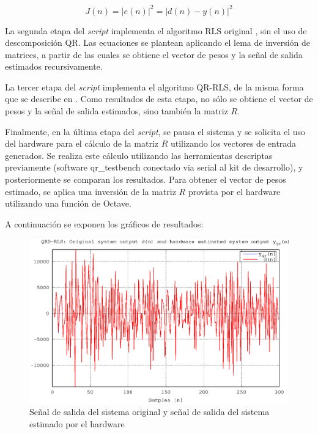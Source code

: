 \begin{equation}
J(n) = |e(n)|^2 = |d(n) - y(n)|^2
\end{equation}

La segunda etapa del \textit{script} implementa el algoritmo RLS original \cite{Haykin}, sin el uso de descomposición QR. Las ecuaciones se plantean aplicando el lema de inversión de matrices, a partir de las cuales se obtiene el vector de pesos y la señal de salida estimados recursivamente.

La tercer etapa del \textit{script} implementa el algoritmo QR-RLS, de la misma forma que se describe en \cite{Haykin}. Como resultados de esta etapa, no sólo se obtiene el vector de pesos y la señal de salida estimados, sino también la matriz $R$.

Finalmente, en la última etapa del \textit{script}, se pausa el sistema y se solicita el uso del hardware para el cálculo de la matriz $R$ utilizando los vectores de entrada generados. Se realiza este cálculo utilizando las herramientas descriptas previamente (software qr\_testbench conectado via serial al kit de desarrollo), y posteriormente se comparan los resultados. Para obtener el vector de pesos estimado, se aplica una inversión de la matriz $R$ provista por el hardware utilizando una función de Octave.

\newpage

A continuación se exponen los gráficos de resultados:

\begin{figure}[htb!]
    \centering
        \includegraphics[width = 11 cm]{./figures/C05-hard_estimated_output}
        \caption{Señal de salida del sistema original y señal de salida del sistema estimado por el hardware}
        \label{fig:hard_estimated_output}
\end{figure}

